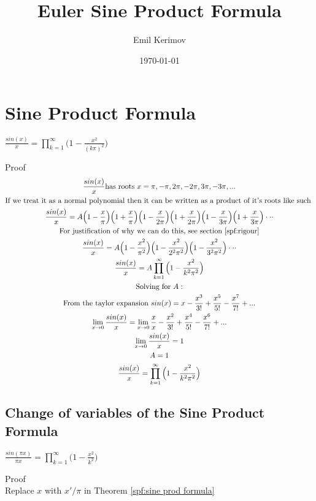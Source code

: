 \documentclass[a4paper]{article}
\title{Euler Sine Product Formula}
\author{Emil Kerimov}
\date{\today}
\begin{document}
\maketitle



\section{Sine Product Formula}

\begin{theorem} \label{spf:sine prod formula} 
$\boxed{\frac{sin(x)}{x} = \prod_{k=1}^{\infty} \Big( 1-\frac{x^2}{(k\pi)^2} \Big)}$

Proof
\begin{gather*}
\frac{sin(x)}{x} \text{has roots } x = \pi, -\pi, 2\pi, -2\pi, 3\pi, -3\pi, ... \\
\text{If we treat it as a normal polynomial then it can be written as a product of it's roots like such }\\
\frac{sin(x)}{x} = A \Big(1-\frac{x}{\pi}\Big)\Big(1+\frac{x}{\pi}\Big)
\Big(1-\frac{x}{2\pi}\Big)
\Big(1+\frac{x}{2\pi}\Big)
\Big(1-\frac{x}{3\pi}\Big)
\Big(1+\frac{x}{3\pi}\Big) \cdot \cdot \cdot \\
\text{For justification of why we can do this, see section \ref{spf:rigour}}\\
\frac{sin(x)}{x} = A \Big(1-\frac{x^2}{\pi^2}\Big)
\Big(1-\frac{x^2}{2^2 \pi^2}\Big)
\Big(1-\frac{x^2}{3^2 \pi^2}\Big) \cdot \cdot \cdot \\
\frac{sin(x)}{x} = A \prod_{k=1}^{\infty}
\Big(1-\frac{x^2}{k^2 \pi^2}\Big)
\\
\text{Solving for } A:
\\
\text{From the taylor expansion }
sin(x) = x - \frac{x^3}{3!} + \frac{x^5}{5!} - \frac{x^7}{7!} + ... \\
\lim_{x \to 0} \frac{sin(x)}{x} = \lim_{x \to 0} \frac{x}{x} - \frac{x^2}{3!} + \frac{x^4}{5!} - \frac{x^6}{7!} + ... \\
\lim_{x \to 0} \frac{sin(x)}{x} = 1\\
 A = 1 \\
 \frac{sin(x)}{x} = \prod_{k=1}^{\infty}
\Big(1-\frac{x^2}{k^2 \pi^2}\Big)
\end{gather*}
\end{theorem}

\subsection{Change of variables of the Sine Product Formula}
\begin{theorem} \label{spf:sine prod formula no pi} 
$\boxed{\frac{sin(\pi x)}{\pi x} = \prod_{k=1}^{\infty} \Big( 1-\frac{x^2}{k^2} \Big)}$

Proof\\
Replace $x$ with $x'/\pi$ in Theorem \ref{spf:sine prod formula}
\end{theorem}
\end{document}
